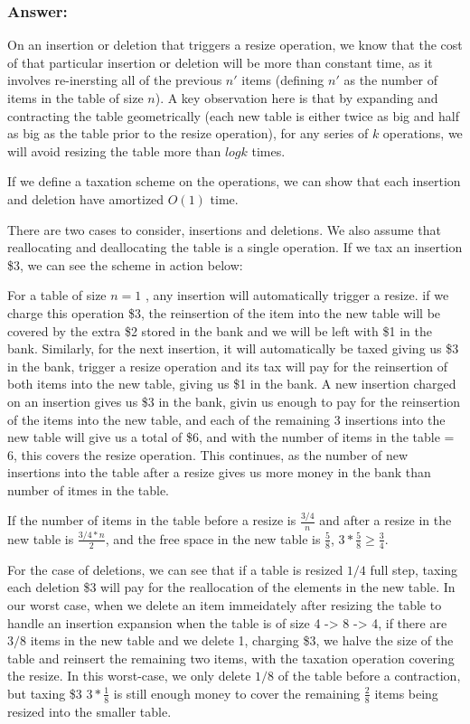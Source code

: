 \documentclass[titlepage]{article}\usepackage[]{graphicx}\usepackage[]{color}
\begin{document}
\subsubsection{Answer:}
On an insertion or deletion that triggers a resize operation, we know that the
cost of that particular insertion or deletion will be more than constant time,
as it involves re-inersting all of the previous $n'$ items (defining $n'$ as
the number of items in the table of size $n$). A key observation here is that
by expanding and contracting the table geometrically (each new table is either 
twice as big and half as big as the table prior to the resize operation), for
any series of $k$ operations, we will avoid resizing the table more than $log k$ 
times. 

If we define a taxation scheme on the operations, we can show that each
insertion and deletion have amortized $O(1)$ time. 

There are two cases to consider, insertions and deletions. We also assume that
reallocating and deallocating the table is a single operation. If we tax an
insertion \$3, we can see the scheme in action below:

For a table of size $n=1$ , any insertion will automatically trigger a resize.
if we charge this operation \$3, the reinsertion of the item into the new table
will be covered by the extra \$2 stored in the bank and we will be left with 
\$1 in the bank. Similarly, for the next insertion, it will automatically
be taxed giving us \$3 in the bank, trigger a resize operation and its tax will
pay for the reinsertion of both items into the new table, giving us \$1 in the
bank. A new insertion charged on an insertion gives us \$3 in the bank, givin
us enough to pay for the reinsertion of the items into the new table, and each
of the remaining 3 insertions into the new table will give us a total of \$6,
and with the number of items in the table = 6, this covers the resize
operation. This continues, as the number of new insertions into the table after
a resize gives us more money in the bank than number of itmes in the table. 

If the number of items in the table before a resize is $\frac{3/4}n$ and after a resize
in the new table is $\frac{3/4 *n}{2}$, and the free space in the new table is
$\frac{5}{8} $, $3 * \frac{5}{8} \geq \frac{3}{4}$. 

For the case of deletions, we can see that if a table is resized
$1/4$ full step, taxing each deletion \$3 will pay for the reallocation of the
elements in the new table. In our worst case, when we delete an item
immeidately after resizing the table to handle an insertion expansion when the
table is of size 4 -> 8 -> 4, if there are $3/8$ items in the new table and we
delete 1, charging \$3, we halve the size of the table and reinsert the
remaining two items, with the taxation operation covering the resize. In this
worst-case, we only delete $1/8$ of the table before a contraction, but taxing
\$3 $ 3* \frac{1}{8}$ is still enough money to cover the remaining
$\frac{2}{8}$ items being resized into the smaller table.
\end{document}
